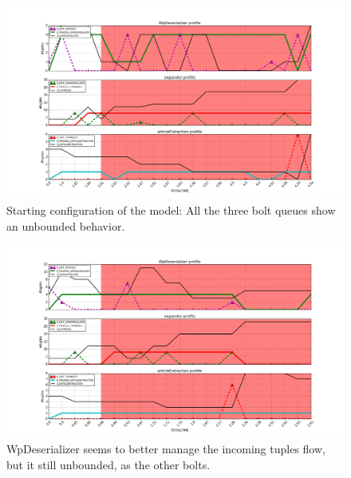 \begin{figure}[h]
	\centering
	\includegraphics[width=0.7\linewidth]{images/appendix/3bolts-1}
	\caption{Starting configuration of the model: All the three bolt queues show an unbounded behavior.}
	\label{fig:3bolts-1}
\end{figure}

\begin{figure}[h]
	\centering
	\includegraphics[width=0.7\linewidth]{images/appendix/3bolts-2}
	\caption{WpDeserializer seems to better manage the incoming tuples flow, but it still unbounded, as the other bolts.}
	\label{fig:3bolts-2}
\end{figure}

